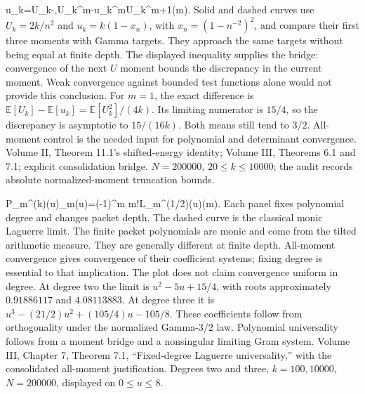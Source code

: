 {u_k=U_k-,\le U_k^m-u_k^m\le{}U_k^{m+1}\quad(m).}
{Solid and dashed curves use $U_k=2k/n^2$ and $u_k=k(1-x_n)$, with $x_n=(1-n^{-2})^2$, and compare their first three moments with Gamma targets. They approach the same targets without being equal at finite depth. The displayed inequality supplies the bridge: convergence of the next $U$ moment bounds the discrepancy in the current moment. Weak convergence against bounded test functions alone would not provide this conclusion.}
{For $m=1$, the exact difference is $\mathbb E[U_k]-\mathbb E[u_k]=\mathbb E[U_k^2]/(4k)$. Its limiting numerator is $15/4$, so the discrepancy is asymptotic to $15/(16k)$. Both means still tend to $3/2$.}
{All-moment control is the needed input for polynomial and determinant convergence.}
{Volume II, Theorem 11.1's shifted-energy identity; Volume III, Theorems 6.1 and 7.1; explicit consolidation bridge. $N=200000$, $20\le k\le10000$; the audit records absolute normalized-moment truncation bounds.}

{P_m^{(k)}(u)\longrightarrow\Lambda_m(u)=(-1)^m m!L_m^{(1/2)}(u)\quad(m).}
{Each panel fixes polynomial degree and changes packet depth. The dashed curve is the classical monic Laguerre limit. The finite packet polynomials are monic and come from the tilted arithmetic measure. They are generally different at finite depth. All-moment convergence gives convergence of their coefficient systems; fixing degree is essential to that implication. The plot does not claim convergence uniform in degree.}
{At degree two the limit is $u^2-5u+15/4$, with roots approximately $0.91886117$ and $4.08113883$. At degree three it is $u^3-(21/2)u^2+(105/4)u-105/8$. These coefficients follow from orthogonality under the normalized Gamma-$3/2$ law.}
{Polynomial universality follows from a moment bridge and a nonsingular limiting Gram system.}
{Volume III, Chapter 7, Theorem 7.1, ``Fixed-degree Laguerre universality,'' with the consolidated all-moment justification. Degrees two and three, $k=100,10000$, $N=200000$, displayed on $0\le u\le8$.}

